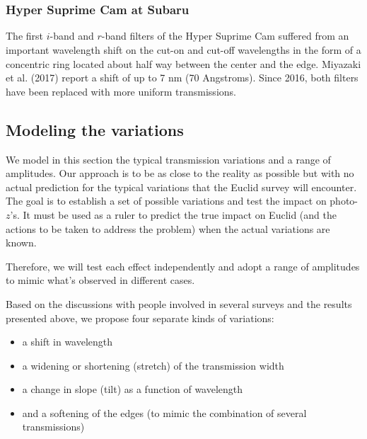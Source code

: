 \documentclass[11pt]{article}
\providecommand{\tightlist}{%
      \setlength{\itemsep}{0pt}\setlength{\parskip}{0pt}}
\begin{document}
    \begin{center}
    \end{center}
    { \hspace*{\fill} \\}
    
    \begin{center}
    \end{center}
    { \hspace*{\fill} \\}
    
    \subsubsection{Hyper Suprime Cam at
Subaru}\label{hyper-suprime-cam-at-subaru}

The first \(i\)-band and \(r\)-band filters of the Hyper Suprime Cam
suffered from an important wavelength shift on the cut-on and cut-off
wavelengths in the form of a concentric ring located about half way
between the center and the edge. Miyazaki et al. (2017) report a shift
of up to 7 nm (70 Angstroms). Since 2016, both filters have been
replaced with more uniform transmissions.

    \subsection{Modeling the variations}\label{modeling-the-variations}

We model in this section the typical transmission variations and a range
of amplitudes. Our approach is to be as close to the reality as possible
but with no actual prediction for the typical variations that the Euclid
survey will encounter. The goal is to establish a set of possible
variations and test the impact on photo-\(z\)'s. It must be used as a
ruler to predict the true impact on Euclid (and the actions to be taken
to address the problem) when the actual variations are known.

Therefore, we will test each effect independently and adopt a range of
amplitudes to mimic what's observed in different cases.

Based on the discussions with people involved in several surveys and the
results presented above, we propose four separate kinds of variations:

\begin{itemize}
\tightlist
\item
  a shift in wavelength
\item
  a widening or shortening (stretch) of the transmission width
\item
  a change in slope (tilt) as a function of wavelength
\item
  and a softening of the edges (to mimic the combination of several
  transmissions)
\end{itemize}
\end{document}
